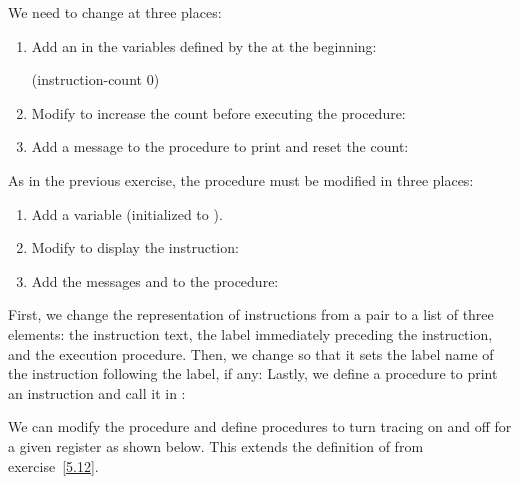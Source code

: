 \begin{exe}[5.15]
    We need to change  at three places:
    \begin{enumerate}[label=\arabic*.]
	\item Add an  in the variables defined by the 
	     at the beginning:
	    \begin{cscm}
		(instruction-count 0)
	    \end{cscm}

	\item Modify  to increase the count before executing the 
	    procedure:

	\item Add a message to the  procedure to print and reset 
	    the count:
    \end{enumerate}
\end{exe}

\begin{exe}[5.16]
    As in the previous exercise, the  procedure must be 
    modified in three places:
    \begin{enumerate}[label=\arabic*.]
	\item Add a  variable (initialized to ).
	\item Modify  to display the instruction:
	\item Add the messages  and  to the 
	     procedure:
    \end{enumerate}
\end{exe}

\begin{exe}[5.17]
    \label{5.17}
    First, we change the representation of instructions from a pair to a list of 
    three elements: the instruction text, the label immediately preceding the 
    instruction, and the execution procedure.
    Then, we change  so that it sets the label name of 
    the instruction following the label, if any:
    Lastly, we define a procedure to print an instruction and call it in 
    :
\end{exe}

\begin{exe}[5.18]
    We can modify the  procedure and define procedures to 
    turn tracing on and off for a given register as shown below. This extends 
    the definition of  from exercise~\ref{5.12}.
\end{exe}


